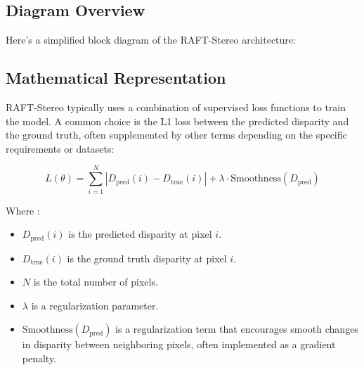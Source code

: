 \documentclass[22pt]{report}
\begin{document}
\subsection{Diagram Overview}
Here’s a simplified block diagram of the RAFT-Stereo architecture:
\begin{center}
    \large
\end{center}
\vspace{20}
\subsection{Mathematical Representation}
RAFT-Stereo typically uses a combination of supervised loss functions to train the model. A common choice is the L1 loss between the predicted disparity and the ground truth, often supplemented by other terms depending on the specific requirements or datasets:
\begin{center}
            \[
            L(\theta) = \sum_{i=1}^{N} \left| D_{\text{pred}}(i) - D_{\text{true}}(i) \right| + \lambda \cdot \text{Smoothness}(D_{\text{pred}})
            \]
\end{center}
Where : 
\begin{itemize}
    \item \( D_{\text{pred}}(i) \) is the predicted disparity at pixel \( i \). 
    \item \( D_{\text{true}}(i) \) is the ground truth disparity at pixel \( i \). 
    \item \( N \) is the total number of pixels. 
    \item \( \lambda \) is a regularization parameter. 
    \item \(\text{Smoothness}(D_{\text{pred}})\) is a regularization term that encourages smooth changes in disparity between neighboring pixels, often implemented as a gradient penalty.
\end{itemize}
\vspace{20}
\end{document}
